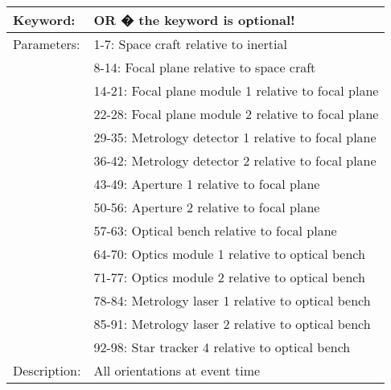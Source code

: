 \begin{table}[htdp]
\begin{center}
\begin{tabular}{|p{2cm}|p{12cm}|}
\hline
Keyword:&	OR � the keyword is optional!\\
\hline
Parameters:&	1-7:  Space craft relative to inertial\\
&8-14: Focal plane relative to space craft \\
&14-21: Focal plane module 1 relative to focal plane\\
&22-28: Focal plane module 2 relative to focal plane\\
&29-35: Metrology detector 1 relative to focal plane\\
&36-42: Metrology detector 2 relative to focal plane\\
&43-49: Aperture 1 relative to focal plane\\
&50-56: Aperture 2 relative to focal plane\\
&57-63: Optical bench relative to focal plane\\
&64-70: Optics module 1 relative to optical bench\\
&71-77: Optics module 2 relative to optical bench\\
&78-84: Metrology laser 1 relative to optical bench\\
&85-91: Metrology laser 2 relative to optical bench\\
&92-98: Star tracker 4 relative to optical bench \\
\hline
Description:&	All orientations at event time\\
\hline
\end{tabular}
\end{center}
\end{table}
